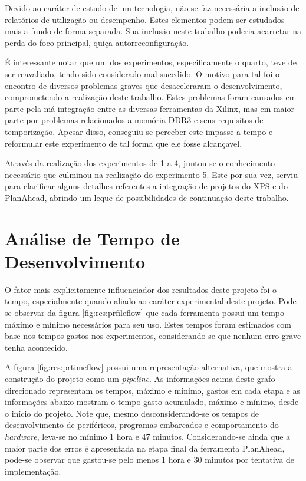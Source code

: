 \documentclass[11pt,a4paper,oneside]{book}
\begin{document}
Devido ao caráter de estudo de um tecnologia, não se faz necessária a inclusão de relatórios de utilização ou desempenho.
Estes elementos podem ser estudados mais a fundo de forma separada.
Sua inclusão neste trabalho poderia acarretar na perda do foco principal, quiça autorreconfiguração.

É interessante notar que um dos experimentos, especificamente o quarto, teve de ser reavaliado, tendo sido considerado mal sucedido.
O motivo para tal foi o encontro de diversos problemas graves que desaceleraram o desenvolvimento, comprometendo a realização deste trabalho.
Estes problemas foram causados em parte pela má integração entre as diversas ferramentas da Xilinx, mas em maior parte por problemas relacionados a memória DDR3 e seus requisitos de temporização.
Apesar disso, conseguiu-se perceber este impasse a tempo e reformular este experimento de tal forma que ele fosse alcançavel.

Através da realização dos experimentos de 1 a 4, juntou-se o conhecimento necessário que culminou na realização do experimento 5.
Este por sua vez, serviu para clarificar alguns detalhes referentes a integração de projetos do XPS e do PlanAhead, abrindo um leque de possibilidades de continuação deste trabalho.

\section{Análise de Tempo de Desenvolvimento}
O fator mais explicitamente influenciador dos resultados deste projeto foi o tempo, especialmente quando aliado ao caráter experimental deste projeto.
Pode-se observar da figura \ref{fig:res:prfileflow} que cada ferramenta possui um tempo máximo e mínimo necessários para seu uso.
Estes tempos foram estimados com base nos tempos gastos nos experimentos, considerando-se que nenhum erro grave tenha acontecido.

A figura \ref{fig:res:prtimeflow} possui uma representação alternativa, que mostra a construção do projeto como um \textit{pipeline}.
As informações acima deste grafo direcionado representam os tempos, máximo e mínimo, gastos em cada etapa e as informações abaixo mostram o tempo gasto acumulado, máximo e mínimo, desde o início do projeto.
Note que, mesmo desconsiderando-se os tempos de desenvolvimento de periféricos, programas embarcados e comportamento do \textit{hardware}, leva-se no mínimo 1 hora e 47 minutos.
Considerando-se ainda que a maior parte dos erros é apresentada na etapa final da ferramenta PlanAhead, pode-se observar que gastou-se pelo menos 1 hora e 30 minutos por tentativa de implementação.
\end{document}
